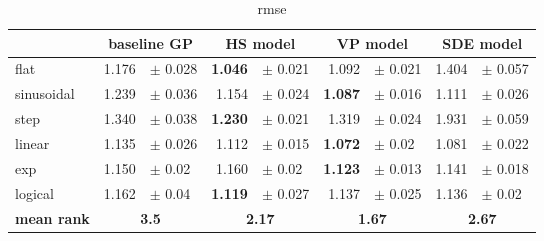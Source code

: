 \begin{table}[] 
 \centering
\begin{tabular}{lrlrlrlrl}
\hline
 &  \multicolumn{2}{c}{baseline GP}  &  \multicolumn{2}{c}{HS model}  &  \multicolumn{2}{c}{VP model}  &  \multicolumn{2}{c}{SDE model}  \\
\hline
flat & 1.176 & $\pm$ 0.028 & \textbf{1.046} & $\pm$ 0.021 & 1.092 & $\pm$ 0.021 & 1.404 & $\pm$ 0.057 \\
sinusoidal & 1.239 & $\pm$ 0.036 & 1.154 & $\pm$ 0.024 & \textbf{1.087} & $\pm$ 0.016 & 1.111 & $\pm$ 0.026 \\
step & 1.340 & $\pm$ 0.038 & \textbf{1.230} & $\pm$ 0.021 & 1.319 & $\pm$ 0.024 & 1.931 & $\pm$ 0.059 \\
linear & 1.135 & $\pm$ 0.026 & 1.112 & $\pm$ 0.015 & \textbf{1.072} & $\pm$ 0.02 & 1.081 & $\pm$ 0.022 \\
exp & 1.150 & $\pm$ 0.02 & 1.160 & $\pm$ 0.02 & \textbf{1.123} & $\pm$ 0.013 & 1.141 & $\pm$ 0.018 \\
logical & 1.162 & $\pm$ 0.04 & \textbf{1.119} & $\pm$ 0.027 & 1.137 & $\pm$ 0.025 & 1.136 & $\pm$ 0.02 \\
\hline
\textbf{mean rank} & \multicolumn{2}{c}{\textbf{3.5}} & \multicolumn{2}{c}{\textbf{2.17}} & \multicolumn{2}{c}{\textbf{1.67}} & \multicolumn{2}{c}{\textbf{2.67}}\\
\hline
\end{tabular}
\caption{rmse}
\label{tab:rmse}
\end{table}
